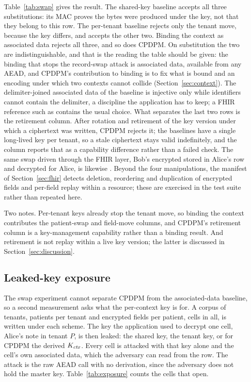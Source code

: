 Table~\ref{tab:swap} gives the result. The shared-key baseline accepts all three substitutions: its MAC proves the bytes were produced under the key, not that they belong to this row. The per-tenant baseline rejects only the tenant move, because the key differs, and accepts the other two. Binding the context as associated data rejects all three, and so does CPDPM. On substitution the two are indistinguishable, and that is the reading the table should be given: the binding that stops the record-swap attack is associated data, available from any AEAD, and CPDPM's contribution to binding is to fix what is bound and an encoding under which two contexts cannot collide (Section~\ref{sec:context}). The delimiter-joined associated data of the baseline is injective only while identifiers cannot contain the delimiter, a discipline the application has to keep; a FHIR reference such as  contains the usual choice. What separates the last two rows is the retirement column. After rotation and retirement of the key version under which a ciphertext was written, CPDPM rejects it; the baselines have a single long-lived key per tenant, so a stale ciphertext stays valid indefinitely, and the column reports that as a capability difference rather than a failed check. The same swap driven through the FHIR layer, Bob's encrypted  stored in Alice's row and decrypted for Alice, is likewise \SwapFhir{}. Beyond the four manipulations, the manifest of Section~\ref{sec:fhir} detects deletion, reordering and duplication of encrypted fields and per-field replay within a resource; these are exercised in the test suite rather than repeated here.

Two notes. Per-tenant keys already stop the tenant move, so binding the context contributes the patient-swap and field-move columns, and CPDPM's retirement column is a key-management capability rather than a binding result. And retirement is not replay within a live key version; the latter is discussed in Section~\ref{sec:discussion}.

\subsection{Leaked-key exposure}
\label{sec:exposure}

The swap experiment cannot separate CPDPM from the associated-data baseline, so a second measurement asks what the per-context key is for. A corpus of \CorpusTenants{} tenants, \CorpusPatients{} patients per tenant and \CorpusFields{} encrypted fields per patient, \CorpusCells{} cells in all, is written under each scheme. The key the application used to decrypt one cell, Alice's note in tenant $P$, is then leaked: the shared key, the tenant key, or for CPDPM the derived $K_{\mathit{ctx}}$. Every cell is attacked with that key alone and the cell's own associated data, which the adversary can read from the row. The attack is the raw AEAD call with no derivation, since the adversary does not hold the master key. Table~\ref{tab:exposure} counts the cells that open.


